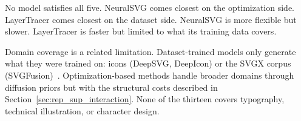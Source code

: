No model satisfies all five. NeuralSVG comes closest 
on the optimization side. LayerTracer comes closest on 
the dataset side. NeuralSVG is more flexible but slower. 
LayerTracer is faster but limited to what its training 
data covers.

Domain coverage is a related limitation. Dataset-trained 
models only generate what they were trained on: icons 
(DeepSVG, DeepIcon) or 
the SVGX corpus 
(SVGFusion)~\cite{carlierDeepSVGHierarchicalGenerative2020, 
bingDeepIconHierarchicalNetwork2024, 
xingSVGFusionScalableTexttoSVG2025}. Optimization-based 
methods handle broader domains through diffusion priors 
but with the structural costs described in 
Section~\ref{sec:rep_sup_interaction}. None of the 
thirteen covers typography, technical illustration, or 
character design.




